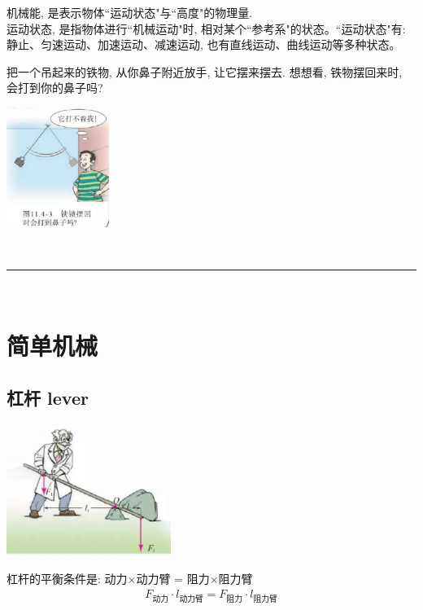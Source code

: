 \documentclass[UTF8]{ctexart}
\begin{document}
	机械能, 是表示物体``运动状态"与``高度"的物理量. \\
	运动状态, 是指物体进行``机械运动"时, 相对某个``参考系"的状态。``运动状态"有: 静止、匀速运动、加速运动、减速运动, 也有直线运动、曲线运动等多种状态。 \\
	
	
	
	\begin{tcolorbox}[title = {例},boxrule={0.1em},colframe={black!10}, colback={black!3},colbacktitle={black!10},coltitle={black}]
把一个吊起来的铁物, 从你鼻子附近放手, 让它摆来摆去. 想想看, 铁物摆回来时, 会打到你的鼻子吗?

\includegraphics[width=0.25\textwidth]{img/0047.png}
	\end{tcolorbox}
	
	
	
	~\\
	\hrule
	~\\
	
	
	\section{简单机械}






	
	\subsection{杠杆 lever}
	
	\includegraphics[width=0.4\textwidth]{img/0048.png}
	
	
	杠杆的平衡条件是: 动力×动力臂 = 阻力×阻力臂	
	\begin{align}
		\boxed{
			F_{\text{动力}}\cdot l_{\text{动力臂}}=F_{\text{阻力}}\cdot l_{\text{阻力臂}}			
		}
	\end{align}
	
\end{document}

